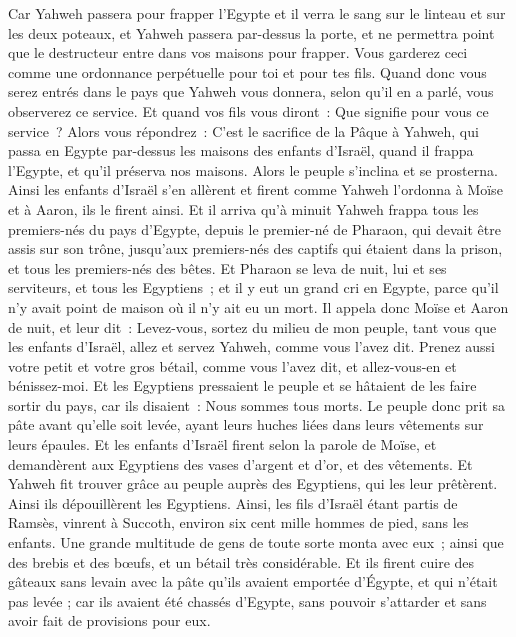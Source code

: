 \begin{multicols}{2}
Car Yahweh passera pour frapper l'Egypte et il verra le sang sur le linteau et sur les deux poteaux, et Yahweh passera par-dessus la porte, et ne permettra point que le destructeur entre dans vos maisons pour frapper.
Vous garderez ceci comme une ordonnance perpétuelle pour toi et pour tes fils.
Quand donc vous serez entrés dans le pays que Yahweh vous donnera, selon qu'il en a parlé, vous observerez ce service.
Et quand vos fils vous diront~: Que signifie pour vous ce service~?
Alors vous répondrez~: C'est le sacrifice de la Pâque à Yahweh, qui passa en Egypte par-dessus les maisons des enfants d'Israël, quand il frappa l'Egypte, et qu'il préserva nos maisons. Alors le peuple s'inclina et se prosterna.
Ainsi les enfants d'Israël s'en allèrent et firent comme Yahweh l'ordonna à Moïse et à Aaron, ils le firent ainsi.
Et il arriva qu'à minuit Yahweh frappa tous les premiers-nés du pays d'Egypte, depuis le premier-né de Pharaon, qui devait être assis sur son trône, jusqu'aux premiers-nés des captifs qui étaient dans la prison, et tous les premiers-nés des bêtes.
Et Pharaon se leva de nuit, lui et ses serviteurs, et tous les Egyptiens~; et il y eut un grand cri en Egypte, parce qu'il n'y avait point de maison où il n'y ait eu un mort.
Il appela donc Moïse et Aaron de nuit, et leur dit~: Levez-vous, sortez du milieu de mon peuple, tant vous que les enfants d'Israël, allez et servez Yahweh, comme vous l'avez dit.
Prenez aussi votre petit et votre gros bétail, comme vous l'avez dit, et allez-vous-en et bénissez-moi.
Et les Egyptiens pressaient le peuple et se hâtaient de les faire sortir du pays, car ils disaient~: Nous sommes tous morts.
Le peuple donc prit sa pâte avant qu'elle soit levée, ayant leurs huches liées dans leurs vêtements sur leurs épaules.
Et les enfants d'Israël firent selon la parole de Moïse, et demandèrent aux Egyptiens des vases d'argent et d'or, et des vêtements.
Et Yahweh fit trouver grâce au peuple auprès des Egyptiens, qui les leur prêtèrent. Ainsi ils dépouillèrent les Egyptiens.
Ainsi, les fils d'Israël étant partis de Ramsès, vinrent à Succoth, environ six cent mille hommes de pied, sans les enfants.
Une grande multitude de gens de toute sorte monta avec eux~; ainsi que des brebis et des bœufs, et un bétail très considérable.
 Et ils firent cuire des gâteaux sans levain avec la pâte qu'ils avaient emportée d'Égypte, et qui n'était pas levée ; car ils avaient été chassés d'Egypte, sans pouvoir s'attarder et sans avoir fait de provisions pour eux.

\end{multicols}
